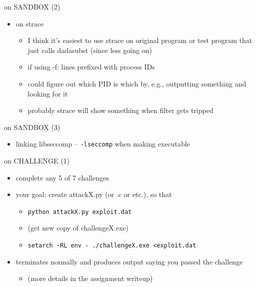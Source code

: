 \begin{frame}{on SANDBOX (2)}
    \begin{itemize}
    \item on strace
        \begin{itemize}
        \item I think it's easiest to use strace on original program or test program that just calls dadasubst (since less going on)
        \item if using -f: lines prefixed with process IDs
        \item could figure out which PID is which by, e.g., outputting something and looking for it
        \item probably strace will show something when filter gets tripped
        \end{itemize}
    \end{itemize}
\end{frame}

\begin{frame}{on SANDBOX (3)}
    \begin{itemize}
    \item linking libseccomp -- \texttt{-lseccomp} when making executable
    \end{itemize}
\end{frame}

\begin{frame}{on CHALLENGE (1)}
    \begin{itemize}
    \item complete any 5 of 7 challenges
    \item your goal: create attackX.py (or .c or etc.), so that
        \begin{itemize}
        \item \texttt{python attackX.py exploit.dat}
        \item (get new copy of challengeX.exe)
        \item \texttt{setarch -RL env - ./challengeX.exe <exploit.dat}
        \end{itemize}
    \item terminates normally and produces output saying you passed the challenge
        \begin{itemize}
        \item (more details in the assignment writeup)
        \end{itemize}
    \end{itemize}
\end{frame}

